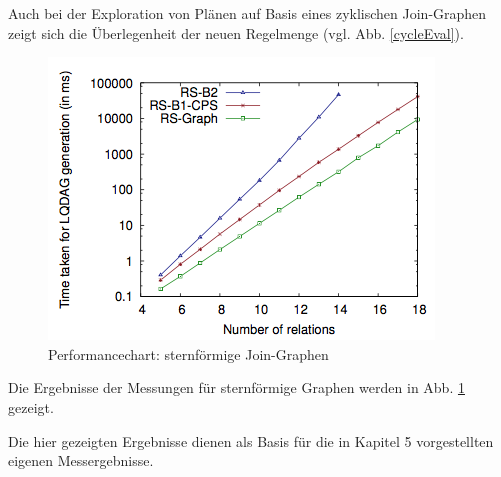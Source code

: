 Auch bei der Exploration von Plänen auf Basis eines zyklischen Join-Graphen zeigt sich die Überlegenheit der neuen Regelmenge (vgl. Abb. \ref{cycleEval}).


\begin{figure}[ht]
  \centering
  \includegraphics[scale=0.8]{03_Regeln/00_media/star.png}
  \caption{Performancechart: sternförmige Join-Graphen}
  \label{starEval}
\end{figure}

Die Ergebnisse der Messungen für sternförmige Graphen werden in Abb. \ref{starEval} gezeigt.


Die hier gezeigten Ergebnisse dienen als Basis für die in Kapitel 5 vorgestellten eigenen Messergebnisse.









